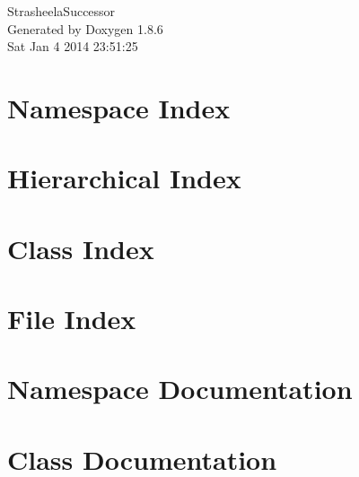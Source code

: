 \documentclass[twoside]{book}
\newcommand{\clearemptydoublepage}{%
  \newpage{\pagestyle{empty}\cleardoublepage}%
}
\begin{document}
\hypersetup{pageanchor=false}
\begin{titlepage}
\vspace*{7cm}
\begin{center}%
{\Large Strasheela\-Successor }\\
\vspace*{1cm}
{\large Generated by Doxygen 1.8.6}\\
\vspace*{0.5cm}
{\small Sat Jan 4 2014 23:51:25}\\
\end{center}
\end{titlepage}
\clearemptydoublepage
\tableofcontents
\clearemptydoublepage
{}
\hypersetup{pageanchor=true}

\chapter{Namespace Index}

\chapter{Hierarchical Index}

\chapter{Class Index}

\chapter{File Index}

\chapter{Namespace Documentation}

\chapter{Class Documentation}


















\end{document}
